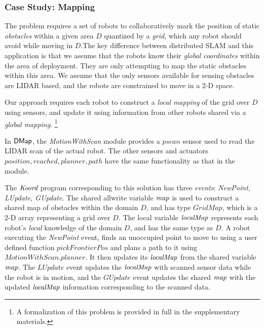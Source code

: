 \subsubsection{Case Study: Mapping}

 The problem requires a set of robots to collaboratively mark the position of static \emph{obstacles} within a given area $D$ quantized by a \emph{grid}, which any robot should avoid while moving in $D$.The key difference between distributed SLAM and this application is that we assume that the robots know their \emph{global coordinates} within the area of deployment. They are only attempting to map the static obstacles within this area. We assume that the only sensors available for sensing obstacles are LIDAR based, and the robots are constrained to move in a 2-D space.


 Our approach requires each robot to construct a \emph{local mapping} of the grid over $D$ using sensors, and update it using information from other robots shared via a \emph{global mapping}. \footnote{A formalization of this problem is provided in full in the supplementary materials. }

\newcommand{\MotionWithScan}{\emph{MotionWithScan}\xspace}

In ${\sf DMap}$, the \MotionWithScan module provides a $\mathit{pscan}$ sensor used to read the LIDAR scan of the actual robot. The other sensors and actuators $\mathit{position,reached,planner,path}$ have the same functionality as that in the \Motion module.

 The $\emph{Koord}$ program corresponding to this solution has three \emph{events}: \emph{NewPoint, LUpdate, GUpdate}. The shared allwrite variable $\mathit{map}$ is used to construct a shared map of obstacles within the domain $D$, and has type $\mathit{GridMap}$, which is a 2-D array representing a grid over $D$. The local variable $\mathit{localMap}$ represents each robot's \emph{local} knowledge of the domain $D$, and has the same type as $D$. A robot executing the \emph{NewPoint} event, finds an unoccupied point to move to using a user defined function $\mathit{pickFrontierPos}$ and plans a path to it using $\mathit{MotionWithScan.planner}$. It then updates its $\mathit{localMap}$ from the shared variable $\mathit{map}$. The $\mathit{LUpdate}$ event updates the $\mathit{localMap}$ with scanned sensor data while the robot is in motion, and the $\mathit{GUpdate}$ event updates the shared $\mathit{map}$ with the updated $\mathit{localMap}$ information corresponding to the scanned data.




